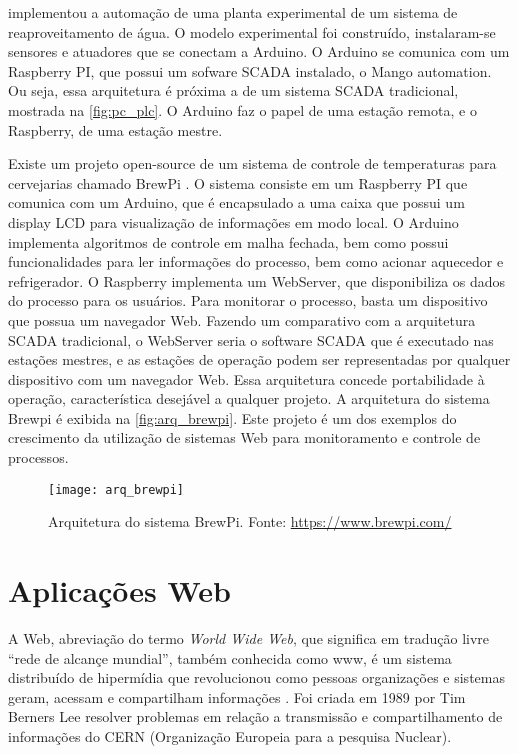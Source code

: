 			\textcite{lucas2016} implementou a automação de uma planta experimental de um sistema de reaproveitamento de água. O modelo experimental foi construído, instalaram-se sensores e atuadores que se conectam a Arduino. O Arduino se comunica com um Raspberry PI, que possui um sofware SCADA instalado, o Mango automation. Ou seja, essa arquitetura é próxima a de um sistema SCADA tradicional, mostrada na \autoref{fig:pc_plc}. O Arduino faz o papel de uma estação remota, e o Raspberry, de uma estação mestre.
			
			Existe um projeto open-source de um sistema de controle de temperaturas para cervejarias chamado BrewPi \cite{brewpi}. O sistema consiste em um Raspberry PI que comunica com um Arduino, que é encapsulado a uma caixa que possui um display LCD para visualização de informações em modo local. O Arduino implementa algoritmos de controle em malha fechada, bem como possui funcionalidades para ler informações do processo, bem como acionar aquecedor e refrigerador. O Raspberry implementa um WebServer, que disponibiliza os dados do processo para os usuários. Para monitorar o processo, basta um dispositivo que possua um navegador Web. Fazendo um comparativo com a arquitetura SCADA tradicional, o WebServer seria o software SCADA que é executado nas estações mestres, e as estações de operação podem ser representadas por qualquer dispositivo com um navegador Web. Essa arquitetura concede portabilidade à operação, característica desejável a qualquer projeto. A arquitetura do sistema Brewpi é exibida na \autoref{fig:arq_brewpi}. Este projeto é um dos exemplos do crescimento da utilização de sistemas Web para monitoramento e controle de processos.
			
			\begin{figure}[!htb]	
				\captionsetup{justification=centering}
				\begin{center}
					\texttt{[image: arq\_brewpi]}  %
					\caption[Arquitetura do sistema BrewPi]{\label{fig:arq_brewpi}Arquitetura do sistema BrewPi. Fonte: \url{https://www.brewpi.com/} }
				\end{center}		
			\end{figure}
		
	\section{Aplicações Web}
		A Web, abreviação do termo \textit{World Wide Web}, que significa em tradução livre ``rede de alcançe mundial'', também conhecida como www, é um sistema distribuído de hipermídia que revolucionou como pessoas organizações e sistemas geram, acessam e compartilham informações \cite{bernes2000}. Foi criada em 1989 por Tim Berners Lee resolver problemas em relação a transmissão e compartilhamento de informações do CERN (Organização Europeia para a pesquisa Nuclear).
		
